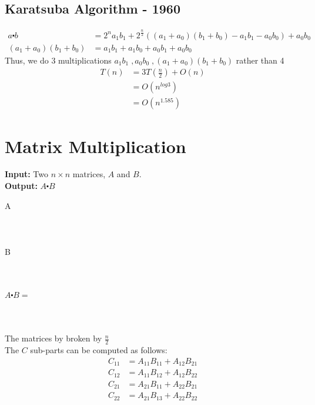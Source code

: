 \documentclass{article}
\theoremstyle{definition}
\theoremstyle{remark}
\theoremstyle{plain}
\begin{document}
\subsection{Karatsuba Algorithm - 1960}
\begin{equation*}
\begin{split}
a\centerdot b & = 2^n a_1 b_1 + 2^{\frac{n}{2}}((a_1 + a_0)(b_1 +b_0) - a_1 b_1 - a_0 b_0) + a_0 b_0\\
(a_1 +  a_0) (b_1 + b_0) & = a_1 b_1 + a_1 b_0 + a_0  b_1 + a_0 b_0
\end{split}
\end{equation*}
Thus, we do 3 multiplications $a_1 b_1 \;, a_0 b_0 \;, (a_1 + a_0)(b_1 +b_0)$ rather than 4 \\

\begin{equation*}
\begin{split}
T(n)   & =   3 T(\frac{n}{2}) + O(n) \\
 & =  O(n^{log 3})\\
 & = O(n^{1.585})
\end{split}
\end{equation*}

\section{Matrix Multiplication}
\textbf{Input:} Two $n \times n$ matrices, $A$ and $B$.\\
\textbf{Output:} $A \centerdot B$

A \\
    \\
   \\\\
 
B \\
    \\
   \\\\
 
 $A \centerdot B = $\\
    \\
   \\\\
The matrices by broken by $\frac{n}{2}$\\
The $C$ sub-parts can be computed as follows:\\
\begin{equation*}
\begin{split}
C_{11} & = A_{11} B_{11} + A_{12} B_{21}\\
C_{12} & = A_{11} B_{12} + A_{12} B_{22}\\
C_{21} & = A_{21} B_{11} + A_{22} B_{21}\\
C_{22} & = A_{21} B_{13} + A_{22} B_{22}\\
\end{split}
\end{equation*}
\end{document}
